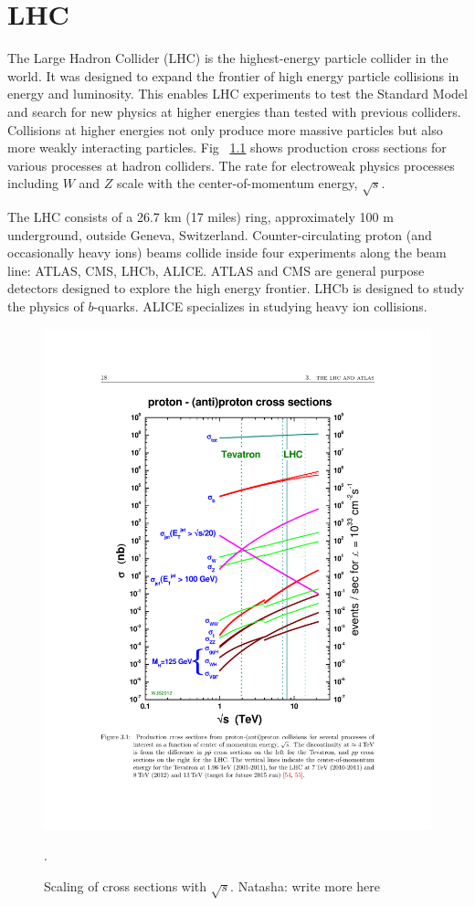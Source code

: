 \label{ch:detector}
\chapter{LHC}
The Large Hadron Collider (LHC) is the highest-energy particle collider in the world. It was designed to expand the frontier of high energy particle collisions in energy and luminosity. This enables LHC experiments to test the Standard Model and search for new physics at higher energies than tested with previous colliders. Collisions at higher energies not only produce more massive particles but also more weakly interacting particles. Fig ~\ref{fig:xs_scaling} shows production cross sections for various processes at hadron colliders. The rate for electroweak physics processes including $W$ and $Z$ scale with the center-of-momentum energy, $\sqrt{s}$.

The LHC consists of a 26.7 km (17 miles) ring, approximately 100 m underground, outside Geneva, Switzerland. Counter-circulating proton (and occasionally heavy ions) beams collide inside four experiments along the beam line: ATLAS, CMS, LHCb, ALICE. ATLAS and CMS are general purpose detectors designed to explore the high energy frontier. LHCb is designed to study the physics of $b$-quarks. ALICE specializes in studying heavy ion collisions. 


\begin{figure}[h!]
  \centering
  \includegraphics[width=\hsize]{figures/Detector/xs_scaling.pdf}
  \caption{Scaling of cross sections with $\sqrt{s}$. Natasha: write more here}. 
  \label{fig:xs_scaling}
\end{figure}
\FloatBarrier


